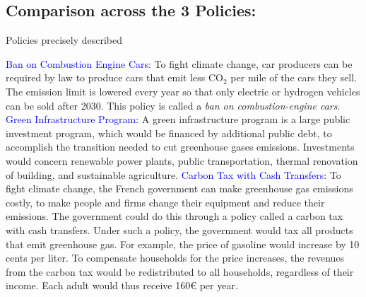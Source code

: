 \begin{framefont}{\small}
\subsection{Comparison across the 3 Policies:}

\begin{frame}{Policies precisely described}%
\begin{itemize}
\ip \textcolor{blue}{Ban on Combustion Engine Cars}: To fight climate change, car producers can be required by law to produce cars that emit less CO$_\text{2}$ per mile of the cars they sell. The emission limit is lowered every year so that only electric or hydrogen vehicles can be sold after 2030. This policy is called a \textit{ban on combustion-engine cars}.
\ip \textcolor{blue}{Green Infrastructure Program}: A green infrastructure program is a large public investment program, which would be financed by additional public debt, to accomplish the transition needed to cut greenhouse gases emissions. Investments would concern renewable power plants, public transportation, thermal renovation of building, and sustainable agriculture.
\ip \textcolor{blue}{Carbon Tax with Cash Transfers}: To fight climate change, the French government can make greenhouse gas emissions costly, to make people and firms change their equipment and reduce their emissions. The government could do this through a policy called a carbon tax with cash transfers. Under such a policy, the government would tax all products that emit greenhouse gas. For example, the price of gasoline would increase by 10 cents per liter. To compensate households for the price increases, the revenues from the carbon tax would be redistributed to all households, regardless of their income. Each adult would thus receive 160\euro{} per year.
\end{itemize}
\end{frame}


\end{framefont}
